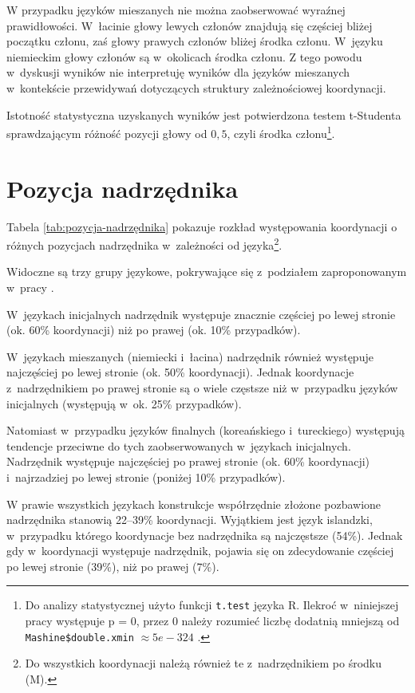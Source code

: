 W przypadku języków mieszanych nie można zaobserwować wyraźnej prawidłowości. W~łacinie głowy lewych członów znajdują się częściej bliżej początku członu, zaś głowy prawych członów bliżej środka członu. W~języku niemieckim głowy członów są w~okolicach środka członu. Z tego powodu w~dyskusji wyników nie interpretuję wyników dla języków mieszanych w~kontekście przewidywań dotyczących struktury zależnościowej koordynacji.

Istotność statystyczna uzyskanych wyników jest potwierdzona testem t-Studenta sprawdzającym różność pozycji głowy od $0{,}5$, czyli środka członu\footnote{
Do analizy statystycznej użyto funkcji \texttt{t.test} języka R. Ilekroć w~niniejszej pracy występuje p = 0, przez 0 należy rozumieć liczbę dodatnią mniejszą od \texttt{Mashine\$double.xmin} $\approx 5e-324$ \citep{R2023}.}.

\section{Pozycja nadrzędnika}

Tabela \ref{tab:pozycja-nadrzędnika} pokazuje rozkład występowania koordynacji o różnych pozycjach nadrzędnika w~zależności od języka\footnote{
Do wszystkich koordynacji należą również te z~nadrzędnikiem po środku (M).}.



Widoczne są trzy grupy językowe, pokrywające się z~podziałem zaproponowanym w~pracy \cite{polinsky2012headedness}.

W~językach inicjalnych nadrzędnik występuje znacznie częściej po lewej stronie (ok. 60\% koordynacji) niż po prawej (ok. 10\% przypadków).

W~językach mieszanych (niemiecki i~łacina) nadrzędnik również występuje najczęściej po lewej stronie (ok. 50\% koordynacji). Jednak koordynacje z~nadrzędnikiem po prawej stronie są o wiele częstsze niż w~przypadku języków inicjalnych (występują w~ok. 25\% przypadków).

Natomiast w~przypadku języków finalnych (koreańskiego i~tureckiego) występują tendencje przeciwne do tych zaobserwowanych w~językach inicjalnych. Nadrzędnik występuje najczęściej po prawej stronie (ok. 60\% koordynacji) i~najrzadziej po lewej stronie (poniżej 10\% przypadków). 

W prawie wszystkich językach konstrukcje współrzędnie złożone pozbawione nadrzędnika stanowią 22--39\% koordynacji.  Wyjątkiem jest język islandzki, w~przypadku którego koordynacje bez nadrzędnika są najczęstsze (54\%). Jednak gdy w~koordynacji występuje nadrzędnik, pojawia się on zdecydowanie częściej po lewej stronie (39\%), niż po prawej (7\%).

